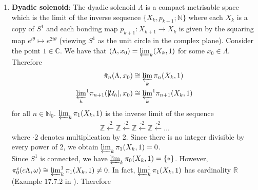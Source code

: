 \documentclass[a4paper,11pt]{article}
\theoremstyle{definition}
\theoremstyle{plain}
\theoremstyle{remark}
\begin{document}
{\begin{enumerate}
Let $x_0\in S_{W}$. The Warsaw circle $(S_{W},x_0)$ is pointed shape equivalent to $(S^1, s)$. To see this, consider the inverse system $\{N_{k},\iota_{k+1,k};\mathbb{N}\}$ of $\frac{1}{k}$-neighbourhoods of $S_{W}$ in $\mathbb{R}^2$. By the discussion in Subsection \ref{inversesc}, this system is a pointed shape expansion of $(S_{W},x_0)$. It is easy to see that for sufficiently large $k$, the $\frac{1}{k}$-neighbourhood of $S_W$ is homotopy equivalent to a circle (see Figure \ref{fig:warsaw}), and the inclusion maps $\iota_{k+1,k}$ induce the identity on $\pi_{1}(S^1,s) \cong \mathbb{Z}, \pi_{0}(S^1,s) = \{[s]\}$. Therefore $\pi_{1}^{c}(cS_{W},\omega)\cong \mathbb{Z}$, $\pi_{0}^{c}(cS_{W},\omega)\cong \{[\omega]\}$ and all higher coarse homotopy groups vanish. 

\item \textbf{Dyadic solenoid}: The dyadic solenoid $\Lambda$ is a compact metrisable space which is the limit of the inverse sequence $\{X_{k}, p_{k+1};\mathbb{N}\}$ where each $X_{k}$ is a copy of $S^1$ and each bonding map $p_{k+1}: X_{k+1}\rightarrow X_{k}$ is given by the squaring map $e^{i\theta}\mapsto e^{2i\theta}$ (viewing $S^1$ as the unit circle in the complex plane). Consider the point $1\in \mathbb{C}$. We have that $(\Lambda, x_0) = \varprojlim_{k} (X_{k},1)$ for some $x_0\in \Lambda$. Therefore 
\begin{align*}
\check{\pi}_{n}(\Lambda,x_{0}) &\cong \varprojlim_{k} \pi_{n}(X_{k}, 1)\\
{\varprojlim_h}^1 \pi_{n+1}(|\mathcal{U}_{h}|,x_0) &\cong {\varprojlim_k}^1 \pi_{n+1}(X_{k}, 1)
\end{align*}
for all $n\in \mathbb{N}_{0}$. $\varprojlim_{k} \pi_{1}(X_{k}, 1)$ is the inverse limit of the sequence 
\begin{align*}
\mathbb{Z}\xleftarrow{\cdot 2} \mathbb{Z} \xleftarrow{\cdot 2} \mathbb{Z} \xleftarrow{\cdot 2} \mathbb{Z} \xleftarrow{\cdot 2} \dots
\end{align*}
where $\cdot 2$ denotes multiplication by $2$. Since there is no integer divisible by every power of $2$, we obtain $\varprojlim_{k} \pi_{1}(X_{k}, 1)=0$.\\

 Since $S^1$ is connected, we have $\varprojlim_{k} \pi_{0}(X_{k}, 1) = \{\ast\}$. However, $\pi_{0}^{c}(c\Lambda,\omega) \cong \varprojlim^1_{k}\pi_{1}(X_{k},1) \neq 0$. In fact, $\varprojlim^1_{k}\pi_{1}(X_{k},1)$ has cardinality $\mathbb{R}$ (Example $17.7.2$ in \cite{geoghegan2007topological}). Therefore


\end{enumerate}}
\end{document}
